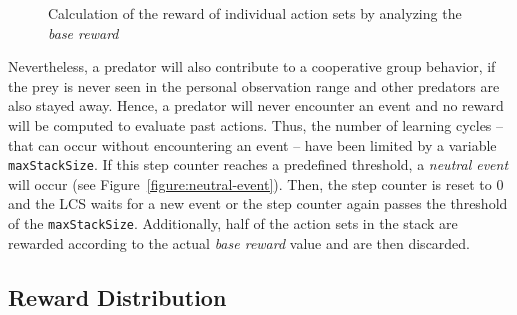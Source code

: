 \begin{figure*}[ht]
  \hfill
  \hfill
	\caption{Calculation of the reward of individual action sets by analyzing the \emph{base reward}}
	\label{figure:experiment}
\end{figure*}


Nevertheless, a predator will also contribute to a cooperative group behavior, if the prey is never seen in the personal observation range and other predators are also stayed away. Hence, a predator will never encounter an event and no reward will be computed to evaluate past actions. Thus, the number of learning cycles -- that can occur without encountering an event -- have been limited by a variable \verb|maxStackSize|. If this step counter reaches a predefined threshold, a \emph{neutral event} will occur (see Figure~\ref{figure:neutral-event}). Then, the step counter is reset to $0$ and the LCS waits for a new event or the step counter again passes the threshold of the \verb|maxStackSize|. Additionally, half of the action sets in the stack are rewarded according to the actual \emph{base reward} value and are then discarded.


\subsection{Reward Distribution}
\label{subsection:reward-distribution}

